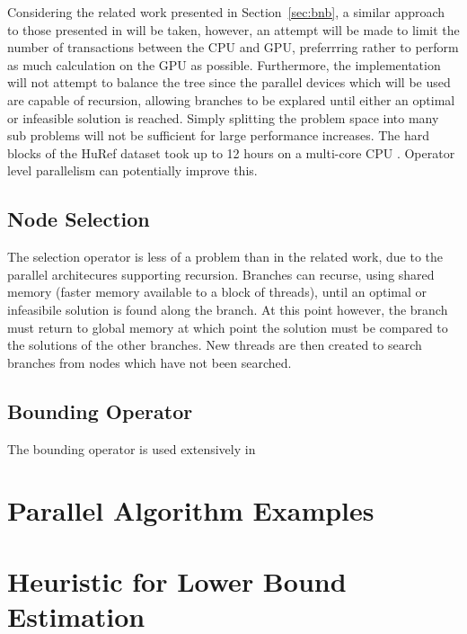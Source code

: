 \documentclass[10pt,twocolumn]{witseiepaper}
\begin{document}
Considering the related work presented in Section~\ref{sec:bnb}, a similar approach to those presented in
\cite{melab:2012, chakroun:2012, chakroun:2013} will be taken, however, an attempt will be made to limit the
number of transactions between the CPU and GPU, preferrring rather to perform as much calculation on the GPU
as possible. Furthermore, the implementation will not attempt to balance the tree since the parallel devices
which will be used are capable of recursion, allowing branches to be explared until either an optimal or
infeasible solution is reached. Simply splitting the problem space into many sub problems will not be
sufficient for large performance increases. The hard blocks of the HuRef dataset took up to 12 hours on a
multi-core CPU \cite{chen:2013}. Operator level parallelism can potentially improve this.

\subsection{Node Selection}

The selection operator is less of a problem than in the related work, due to the parallel architecures
supporting recursion. Branches can recurse, using shared memory (faster memory available to a block of
threads), until an optimal or infeasibile solution is found along the branch. At this point however, the 
branch must return to global memory at which point the solution must be compared to the solutions of the other
branches. New threads are then created to search branches from nodes which have not been searched.

\subsection{Bounding Operator}

The bounding operator is used extensively in




\clearpage 

\appendix

\section{Parallel Algorithm Examples }

\section{Heuristic for Lower Bound Estimation}
\end{document}
